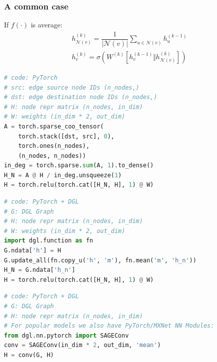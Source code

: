\documentclass[10pt,aspectratio=169]{beamer}
\begin{document}
	\begin{frame}[fragile]
		\frametitle{A common case}
		\begin{minipage}{0.4\textwidth}
			If $f(\cdot)$ is average:
			$$
			\begin{gathered}
			h_{\mathcal{N}(v)}^{(k)} = \dfrac{1}{\left\lvert \mathcal{N}(v) \right\rvert}
			\sum_{u \in \mathcal{N}(v)} h^{(k-1)}_u \\
			h^{(k)}_v =
			\sigma \left( W^{(k)} \left[h_v^{(k-1)} \Vert h_{\mathcal{N}(v)}^{(k)}\right] \right)
			\end{gathered}
			$$
		\end{minipage}\hfill%
		\begin{minipage}{0.5\textwidth}
\begin{lstlisting}[language=Python]
# code: PyTorch
# src: edge source node IDs (n_nodes,)
# dst: edge destination node IDs (n_nodes,)
# H: node repr matrix (n_nodes, in_dim)
# W: weights (in_dim * 2, out_dim)
A = torch.sparse_coo_tensor(
    torch.stack([dst, src], 0),
    torch.ones(n_nodes),
    (n_nodes, n_nodes))
in_deg = torch.sparse.sum(A, 1).to_dense()
H_N = A @ H / in_deg.unsqueeze(1)
H = torch.relu(torch.cat([H_N, H], 1) @ W)
\end{lstlisting}

\begin{lstlisting}[language=Python]
# code: PyTorch + DGL
# G: DGL Graph
# H: node repr matrix (n_nodes, in_dim)
# W: weights (in_dim * 2, out_dim)
import dgl.function as fn
G.ndata['h'] = H
G.update_all(fn.copy_u('h', 'm'), fn.mean('m', 'h_n'))
H_N = G.ndata['h_n']
H = torch.relu(torch.cat([H_N, H], 1) @ W)
\end{lstlisting}

\begin{lstlisting}[language=Python]
# code: PyTorch + DGL
# G: DGL Graph
# H: node repr matrix (n_nodes, in_dim)
# For popular models we also have PyTorch/MXNet NN Modules:
from dgl.nn.pytorch import SAGEConv
conv = SAGEConv(in_dim * 2, out_dim, 'mean')
H = conv(G, H)
\end{lstlisting}
		\end{minipage}
	\end{frame}
\end{document}
